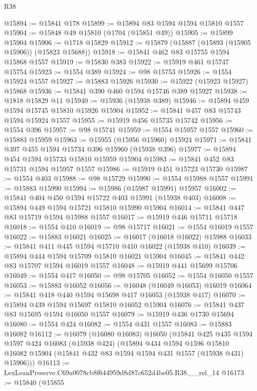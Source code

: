 \begin{lexlean}{R38}
\begin{coremodule}
@15894 := @15841 @178
@15899 := @15894 @83 @1594 @1594 @15810 @1557
@15904 := @15848 @49 @15810 (@1704 (@15851 @49))
@15905 := @15899 @15904
@15906 := @1718 @15829
@15912 := @15879 (@15887 (@15893 (@15905 @15906)) (@15823 @15688))
@15918 := @15841 @462 @83 @15755 @1594 @15868 @1557
@15919 := @15830 @383
@15922 := @15919 @461 @15747 @15754
@15923 := @1554 @389
@15924 := @98 @15753
@15926 := @1554 @15924 @1557
@15927 := @15883 @15926
@15930 := @15922 (@15923 @15927) @15868
@15936 := @15841 @390 @460 @1594 @15746 @389 @15927
@15938 := @1818 @15829 @11
@15940 := @15936 (@15938 @389)
@15946 := @15894 @459 @1594 @15745 @15810 @15926 @15904
@15952 := @15841 @457 @83 @15743 @1594 @15924 @1557
@15955 := @15919 @456 @15735 @15742
@15956 := @1554 @396
@15957 := @98 @15741
@15959 := @1554 @15957 @1557
@15960 := @15883 @15959
@15963 := @15955 (@15956 @15960) @15924
@15971 := @15841 @397 @455 @1594 @15734 @396 @15960 (@15938 @396)
@15977 := @15894 @454 @1594 @15733 @15810 @15959 @15904
@15983 := @15841 @452 @83 @15731 @1594 @15957 @1557
@15986 := @15919 @451 @15723 @15730
@15987 := @1554 @403
@15988 := @98 @15729
@15990 := @1554 @15988 @1557
@15991 := @15883 @15990
@15994 := @15986 (@15987 @15991) @15957
@16002 := @15841 @404 @450 @1594 @15722 @403 @15991 (@15938 @403)
@16008 := @15894 @449 @1594 @15721 @15810 @15990 @15904
@16014 := @15841 @447 @83 @15719 @1594 @15988 @1557
@16017 := @15919 @446 @15711 @15718
@16018 := @1554 @410
@16019 := @98 @15717
@16021 := @1554 @16019 @1557
@16022 := @15883 @16021
@16025 := @16017 (@16018 @16022) @15988
@16033 := @15841 @411 @445 @1594 @15710 @410 @16022 (@15938 @410)
@16039 := @15894 @444 @1594 @15709 @15810 @16021 @15904
@16045 := @15841 @442 @83 @15707 @1594 @16019 @1557
@16048 := @15919 @441 @15699 @15706
@16049 := @1554 @417
@16050 := @98 @15705
@16052 := @1554 @16050 @1557
@16053 := @15883 @16052
@16056 := @16048 (@16049 @16053) @16019
@16064 := @15841 @418 @440 @1594 @15698 @417 @16053 (@15938 @417)
@16070 := @15894 @439 @1594 @15697 @15810 @16052 @15904
@16076 := @15841 @437 @83 @15695 @1594 @16050 @1557
@16079 := @15919 @436 @1730 @15694
@16080 := @1554 @424
@16082 := @1554 @431 @1557
@16083 := @15883 @16082
@16112 := @16079
    (@16080 @16083)
    @16050
    (@15841
      @425
      @435
      @1594
      @1597
      @424
      @16083
      (@15938 @424)
      (@15894
        @434
        @1594
        @1596
        @15810
        @16082
        @15904
        (@15841 @432 @83 @1594 @1594 @431 @1557 (@15938 @431) @15906)))
@16113 := LexLeanPreserve.C69a0078cb8f644959d8d87c652d4be05.R38.__rel_14
@16173 := @15840
    (@15855

\end{coremodule}
\end{lexlean}
